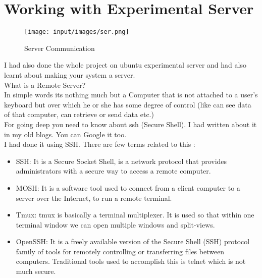 \section{Working with Experimental Server}
\begin{figure}[!ht]
\centering
\texttt{[image: input/images/ser.png]}                   
\caption{Server Communication}
\hspace{-1.5em}
\end{figure}
I had also done the whole project on ubuntu experimental server and had also learnt about making your system a server.\\
What is a Remote Server?\\
In simple words its nothing much but a Computer that is not attached to a user’s keyboard but over which he or she has some degree of control (like can see data of that computer, can retrieve or send data etc.)\\
For going deep you need to know about ssh (Secure Shell). I had  written about it in my old blogs. You can Google it too.\\
I had done it using SSH. There are few terms related to this :\\
\begin{itemize}
\item SSH: It is a Secure Socket Shell, is a network protocol that provides administrators with a secure way to access a remote computer.
\item MOSH: It is a software tool used to connect from a client computer to a server over the Internet, to run a remote terminal. 
\item Tmux: tmux is basically a terminal multiplexer. It is used so that within
one terminal window we can open multiple windows and split-views.
\item OpenSSH: It is a freely available version of the Secure Shell (SSH) protocol family of tools for remotely controlling or transferring files between computers. Traditional tools used to accomplish this is telnet which is not much secure.
\end{itemize}

